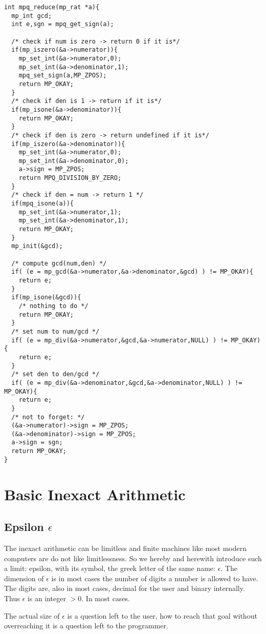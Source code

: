\documentclass[10pt]{book}
\theoremstyle{definition}
\theoremstyle{remark}
\begin{document}
 \begin{center}
    \begin{lstlisting}[caption={Reducing a Rational},label=reducerat]
int mpq_reduce(mp_rat *a){
  mp_int gcd;
  int e,sgn = mpq_get_sign(a);

  /* check if num is zero -> return 0 if it is*/
  if(mp_iszero(&a->numerator)){
    mp_set_int(&a->numerator,0);
    mp_set_int(&a->denominator,1);
    mpq_set_sign(a,MP_ZPOS);
    return MP_OKAY;
  }
  /* check if den is 1 -> return if it is*/
  if(mp_isone(&a->denominator)){
    return MP_OKAY;
  }
  /* check if den is zero -> return undefined if it is*/
  if(mp_iszero(&a->denominator)){
    mp_set_int(&a->numerator,0);
    mp_set_int(&a->denominator,0);
    a->sign = MP_ZPOS;
    return MPQ_DIVISION_BY_ZERO;
  }
  /* check if den = num -> return 1 */
  if(mpq_isone(a)){
    mp_set_int(&a->numerator,1);
    mp_set_int(&a->denominator,1);
    return MP_OKAY;
  }
  mp_init(&gcd);

  /* compute gcd(num,den) */
  if( (e = mp_gcd(&a->numerator,&a->denominator,&gcd) ) != MP_OKAY){
    return e;
  }
  if(mp_isone(&gcd)){
    /* nothing to do */
    return MP_OKAY;
  }
  /* set num to num/gcd */
  if( (e = mp_div(&a->numerator,&gcd,&a->numerator,NULL) ) != MP_OKAY){
    return e;
  }
  /* set den to den/gcd */
  if( (e = mp_div(&a->denominator,&gcd,&a->denominator,NULL) ) != MP_OKAY){
    return e;
  }
  /* not to forget: */
  (&a->numerator)->sign = MP_ZPOS;
  (&a->denominator)->sign = MP_ZPOS;
  a->sign = sgn;
  return MP_OKAY;
}
    \end{lstlisting}
  \end{center}
\chapter{Basic Inexact Arithmetic}
\section{Epsilon $\epsilon$}
The inexact arithmetic can be limitless and finite machines like most modern
computers are do not like limitlessness. So we hereby and herewith introduce
such a limit: epsilon, with its symbol, the greek letter of the same name:
$\epsilon$.
The dimension of $\epsilon$ is in most cases the number of digits a number
is allowed to have. The digits are, also in most cases, decimal for the user
and binary internally. Thus $\epsilon$ is an integer $>0$. In most cases.

The actual size of $\epsilon$ is a question left to the user, how to reach
that goal without overreaching it is a question left to the programmer.
\end{document}
